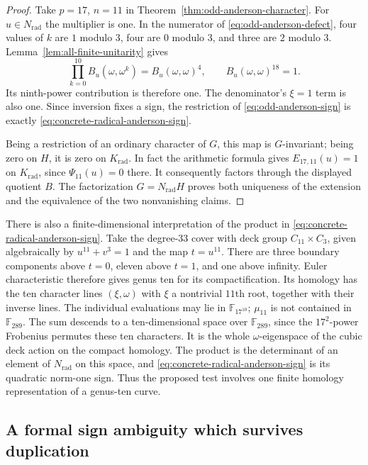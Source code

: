 \begin{proof}
Take $p=17$, $n=11$ in Theorem~\ref{thm:odd-anderson-character}.
For $u\in N_{\mathrm{rad}}$ the multiplier is one.
In the numerator of \eqref{eq:odd-anderson-defect}, four values of
$k$ are $1$ modulo $3$, four are $0$ modulo $3$, and three are $2$
modulo $3$.  Lemma~\ref{lem:all-finite-unitarity} gives
\[
 \prod_{k=0}^{10}B_u(\omega,\omega^k)=B_u(\omega,\omega)^4,
 \qquad B_u(\omega,\omega)^{18}=1.
\]
Its ninth-power contribution is therefore one.  The denominator's
$\xi=1$ term is also one.  Since inversion fixes a sign, the
restriction of \eqref{eq:odd-anderson-sign} is exactly
\eqref{eq:concrete-radical-anderson-sign}.

Being a restriction of an ordinary character of $G$, this map is
$G$-invariant; being zero on $H$, it is zero on $K_{\mathrm{rad}}$.
In fact the arithmetic formula gives $E_{17,11}(u)=1$ on
$K_{\mathrm{rad}}$, since $\Psi_{11}(u)=0$ there.
It consequently factors through the displayed quotient $B$.
The factorization $G=N_{\mathrm{rad}}H$ proves both uniqueness
of the extension and the equivalence of the two nonvanishing claims.
\end{proof}

There is also a finite-dimensional interpretation of the product in
\eqref{eq:concrete-radical-anderson-sign}.  Take the degree-$33$ cover
with deck group $C_{11}\times C_3$, given algebraically by
$u^{11}+v^3=1$ and the map $t=u^{11}$.  There are three boundary
components above $t=0$, eleven above $t=1$, and one above infinity.
Euler characteristic therefore gives genus ten for its compactification.
Its homology has the ten character lines $(\xi,\omega)$ with
$\xi$ a nontrivial $11$th root, together with their inverse lines.
The individual evaluations may lie in $\mathbb F_{17^{10}}$;
$\mu_{11}$ is not contained in $\mathbb F_{289}$.
The sum descends to a ten-dimensional space over $\mathbb F_{289}$,
since the $17^2$-power Frobenius permutes these ten characters.  It is
the whole $\omega$-eigenspace of the cubic deck action on the compact
homology.  The product is the determinant of an element of
$N_{\mathrm{rad}}$ on this space, and
\eqref{eq:concrete-radical-anderson-sign} is its quadratic norm-one
sign.  Thus the proposed test involves one finite homology
representation of a genus-ten curve.

\subsection{A formal sign ambiguity which survives duplication}


